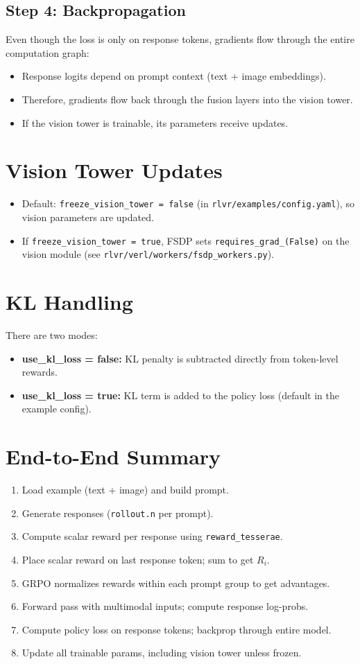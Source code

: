 \documentclass[11pt]{article}
\begin{document}
\subsection{Step 4: Backpropagation}
Even though the loss is only on response tokens, gradients flow through the entire computation graph:
\begin{itemize}
  \item Response logits depend on prompt context (text + image embeddings).
  \item Therefore, gradients flow back through the fusion layers into the vision tower.
  \item If the vision tower is trainable, its parameters receive updates.
\end{itemize}

\section{Vision Tower Updates}
\begin{itemize}
  \item Default: \texttt{freeze\_vision\_tower = false} (in \texttt{rlvr/examples/config.yaml}), so vision parameters are updated.
  \item If \texttt{freeze\_vision\_tower = true}, FSDP sets \texttt{requires\_grad\_(False)} on the vision module (see \texttt{rlvr/verl/workers/fsdp\_workers.py}).
\end{itemize}

\section{KL Handling}
There are two modes:
\begin{itemize}
  \item \textbf{use\_kl\_loss = false:} KL penalty is subtracted directly from token-level rewards.
  \item \textbf{use\_kl\_loss = true:} KL term is added to the policy loss (default in the example config).
\end{itemize}

\section{End-to-End Summary}
\begin{enumerate}
  \item Load example (text + image) and build prompt.
  \item Generate responses (\texttt{rollout.n} per prompt).
  \item Compute scalar reward per response using \texttt{reward\_tesserae}.
  \item Place scalar reward on last response token; sum to get \(R_i\).
  \item GRPO normalizes rewards within each prompt group to get advantages.
  \item Forward pass with multimodal inputs; compute response log-probs.
  \item Compute policy loss on response tokens; backprop through entire model.
  \item Update all trainable params, including vision tower unless frozen.
\end{enumerate}
\end{document}
